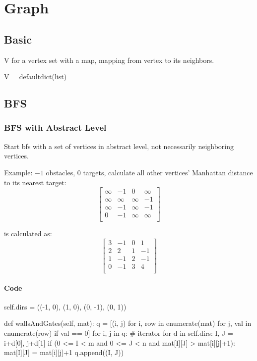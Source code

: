 \chapter{Graph}

\section{Basic}
 V for a vertex set with a map, mapping from vertex to its neighbors.
\begin{python}
V = defaultdict(list)
\end{python}

\section{BFS}
\subsection{BFS with Abstract Level}
Start bfs with a set of vertices in abstract level, not necessarily neighboring vertices.

Example:
$-1$ obstacles, $0$ targets, calculate all other vertices' Manhattan distance to its nearest target:
$$
\begin{bmatrix}
\infty & -1 & 0 & \infty \\
\infty & \infty & \infty & -1 \\
\infty & -1 & \infty & -1 \\
0 & -1 & \infty & \infty \\
\end{bmatrix} 
$$

is calculated as:
$$
\begin{bmatrix}
3 & -1 & 0 & 1 \\
2 & 2 & 1 & -1 \\
1 & -1 & 2 & -1 \\
0 & -1 & 3 & 4 \\
\end{bmatrix}
$$

\subsubsection*{Code}
\begin{python}
self.dirs = ((-1, 0), (1, 0), (0, -1), (0, 1))

def wallsAndGates(self, mat):
    q = [(i, j) for i, row in enumerate(mat) 
         for j, val in enumerate(row) if val == 0]
    for i, j in q:  # iterator
        for d in self.dirs:
            I, J = i+d[0], j+d[1]
            if (0 <= I < m and  0 <= J < n and 
                mat[I][J] > mat[i][j]+1):
                mat[I][J] = mat[i][j]+1
                q.append((I, J))
\end{python}



